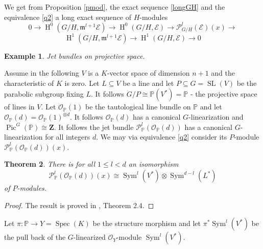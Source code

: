 \documentclass{amsart}
\theoremstyle{plain}
\newtheorem{theorem}{Theorem}[section]
\newtheorem{example}[theorem]{Example}
\theoremstyle{definition}
\theoremstyle{remark}
\numberwithin{equation}{theorem}
\begin{document}
We get from Proposition \ref{pmod}, the exact sequence \ref{longGH}
and the equivalence \ref{q2} a long exact sequence of $H$-modules
\[ 0\rightarrow {\operatorname{H} }^0(G/H,{\mathfrak{m}}^{l+1}{\mathcal{E}})\rightarrow
{\operatorname{H} }^0(G/H,{\mathcal{E}})\rightarrow {\mathcal{P} }^l_{G/H}({\mathcal{E}})(x)\rightarrow \]
\[ {\operatorname{H} }^1(G/H,{\mathfrak{m}}^{l+1}{\mathcal{E}})\rightarrow {\operatorname{H} }^1(G/H,{\mathcal{E}}) \rightarrow 0 \]

\begin{example} Jet bundles on projective space. \end{example}

Assume in the following $V$ is a $K$-vector space of dimension $n+1$
and the characteristic of $K$ is zero. Let $L\subseteq V$ be a line  and let $P\subseteq G={\operatorname{SL}}(V)$ be the
parabolic subgroup fixing $L$. It follows $G/P\cong {\mathbb{P}}(V^*)={\mathbb{P}}$ - the
projective space of lines in $V$. Let ${\mathcal{O} }_{\mathbb{P}}(1)$ be the tautological
line bundle on ${\mathbb{P}}$ and let ${\mathcal{O} }_{\mathbb{P}}(d)={\mathcal{O} }_{\mathbb{P}}(1)^{\otimes d}$. It
follows ${\mathcal{O} }_{\mathbb{P}}(d)$ has a canonical $G$-linearization and
${\operatorname{Pic} }^G({\mathbb{P}})\cong \mathbf{Z}$. It follows the jet bundle
${\mathcal{P} }^l_{\mathbb{P}}({\mathcal{O} }_{\mathbb{P}}(d))$ has a canonical $G$-linearization for all
integers $d$. We may via equivalence \ref{q2} consider its $P$-module
${\mathcal{P} }^l_{\mathbb{P}}({\mathcal{O} }_{\mathbb{P}}(d))(x)$.

\begin{theorem} \label{projectivespace} There is for all $1\leq l <d$ an isomorphism
\[ {\mathcal{P} }^l_{\mathbb{P}}({\mathcal{O} }_{\mathbb{P}}(d))(x)\cong {\operatorname{Sym} }^l(V^*)\otimes {\operatorname{Sym} }^{d-l}(L^*) \]
of $P$-modules.
\end{theorem}
\begin{proof}
The result is proved in \cite{maa1}, Theorem 2.4.
\end{proof}

Let $\pi:{\mathbb{P}}\rightarrow Y={\operatorname{Spec} }(K)$ be the structure morphism and let
$\pi^*{\operatorname{Sym} }^l(V^*)$ be the pull back of the $G$-linearized
${\mathcal{O} }_Y$-module ${\operatorname{Sym} }^l(V^*)$.
\end{document}

